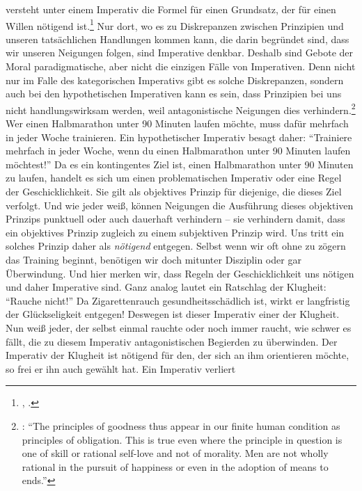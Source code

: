  versteht unter einem Imperativ die Formel für einen
Grundsatz, der für einen Willen nötigend
ist.\footnote{\cite[Vgl.][BA 37]{Kant:GrundlegungzurMetaphysikderSitten1965},
\cite[][IV: 413.9--11]{Kant:GesammelteWerke1900ff.}.} Nur dort, wo es zu
Diskrepanzen zwischen Prinzipien und unseren tatsächlichen Handlungen kommen
kann, die darin begründet sind, dass wir unseren Neigungen folgen, sind
Imperative denkbar. Deshalb sind Gebote der Moral paradigmatische, aber nicht
die einzigen Fälle von Imperativen. Denn nicht nur im Falle des kategorischen
Imperativs gibt es solche Diskrepanzen, sondern auch bei den hypothetischen Imperativen kann es sein, dass
Prinzipien bei uns nicht handlungswirksam werden, weil antagonistische Neigungen
dies verhindern.\footnote{\cite[Vgl.][114]{Paton:TheCategoricalImperative1948}:
\enquote{The principles of goodness thus appear in our finite human condition as
principles of obligation. This is true even where the principle in question is
one of skill or rational self-love and not of morality. Men are not wholly
rational in the pursuit of happiness or even in the adoption of means to ends.}}
Wer einen Halbmarathon unter 90 Minuten laufen möchte, muss dafür mehrfach in
jeder Woche trainieren. Ein hypothetischer Imperativ besagt daher:
\enquote{Trainiere mehrfach in jeder Woche, wenn du einen Halbmarathon unter 90
Minuten laufen möchtest!} Da es ein kontingentes Ziel ist, einen Halbmarathon
unter 90 Minuten zu laufen, handelt es sich um einen problematischen Imperativ
oder eine Regel der Geschicklichkeit. Sie gilt als objektives Prinzip für
diejenige, die dieses Ziel verfolgt. Und wie jeder weiß, können Neigungen die
Ausführung dieses objektiven Prinzips punktuell oder auch dauerhaft verhindern
--  sie verhindern damit, dass ein objektives Prinzip zugleich zu einem
subjektiven Prinzip wird. Uns tritt ein solches Prinzip
daher  als \emph{nötigend} entgegen. Selbst wenn wir oft
ohne zu zögern das Training beginnt, benötigen wir doch mitunter Disziplin oder
gar Überwindung. Und hier merken wir, dass Regeln der Geschicklichkeit uns
nötigen und daher Imperative sind. Ganz analog lautet ein Ratschlag der
Klugheit: \enquote{Rauche nicht!} Da Zigarettenrauch gesundheitsschädlich ist,
wirkt er langfristig der Glückseligkeit entgegen! Deswegen ist dieser Imperativ
einer der Klugheit. Nun weiß jeder, der selbst einmal rauchte oder noch immer
raucht, wie schwer es fällt, die zu diesem Imperativ
antagonistischen Begierden zu überwinden. Der Imperativ der Klugheit ist nötigend für den, der sich an ihm
orientieren möchte, so frei er ihn auch gewählt hat. Ein Imperativ verliert
